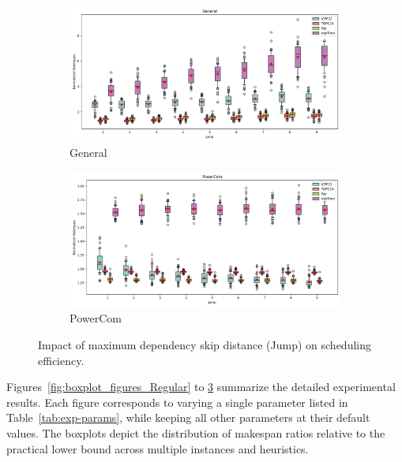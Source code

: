 \documentclass{article}
\begin{document}
\begin{figure}[htbp]
\\[2ex]
\begin{subfigure}[b]{0.32\textwidth}\includegraphics[width=\textwidth]{Results/Jump/Jump_General_boxplot}\caption{General}\label{fig:boxplot_figures_Jump_General}\end{subfigure}
\hfill
\begin{subfigure}[b]{0.32\textwidth}\includegraphics[width=\textwidth]{Results/Jump/Jump_PowerCom_boxplot}\caption{PowerCom}\label{fig:boxplot_figures_Jump_PowerCom}\end{subfigure}
\hfill
\caption{Impact of maximum dependency skip distance (Jump) on scheduling efficiency.}
\label{fig:boxplot_figures_Jump}
\end{figure}


\FloatBarrier 

Figures~\ref{fig:boxplot_figures_Regular} to \ref{fig:boxplot_figures_Jump} summarize the detailed experimental results. Each figure corresponds to varying a single parameter listed in Table~\ref{tab:exp-params}, while keeping all other parameters at their default values. The boxplots depict the distribution of makespan ratios relative to the practical lower bound across multiple instances and heuristics.
\end{document}
